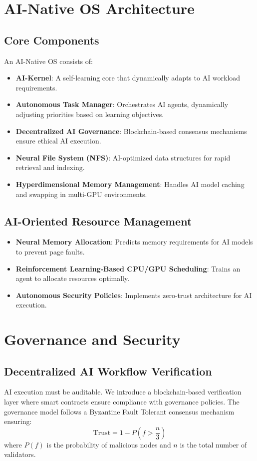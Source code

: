 \documentclass{article}
\begin{document}
\section{AI-Native OS Architecture}
\subsection{Core Components}
An AI-Native OS consists of:
\begin{itemize}
    \item \textbf{AI-Kernel}: A self-learning core that dynamically adapts to AI workload requirements.
    \item \textbf{Autonomous Task Manager}: Orchestrates AI agents, dynamically adjusting priorities based on learning objectives.
    \item \textbf{Decentralized AI Governance}: Blockchain-based consensus mechanisms ensure ethical AI execution.
    \item \textbf{Neural File System (NFS)}: AI-optimized data structures for rapid retrieval and indexing.
    \item \textbf{Hyperdimensional Memory Management}: Handles AI model caching and swapping in multi-GPU environments.
\end{itemize}

\subsection{AI-Oriented Resource Management}
\begin{itemize}
    \item \textbf{Neural Memory Allocation}: Predicts memory requirements for AI models to prevent page faults.
    \item \textbf{Reinforcement Learning-Based CPU/GPU Scheduling}: Trains an agent to allocate resources optimally.
    \item \textbf{Autonomous Security Policies}: Implements zero-trust architecture for AI execution.
\end{itemize}

\section{Governance and Security}
\subsection{Decentralized AI Workflow Verification}
AI execution must be auditable. We introduce a blockchain-based verification layer where smart contracts ensure compliance with governance policies. The governance model follows a Byzantine Fault Tolerant consensus mechanism ensuring:
\begin{equation}
    \text{Trust} = 1 - P(f > \frac{n}{3})
\end{equation}
where $P(f)$ is the probability of malicious nodes and $n$ is the total number of validators.
\end{document}
